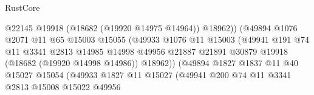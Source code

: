 \begin{lexlean}{RustCore}
\begin{coremodule}
                                            @22145
                                            @19918
                                            (@18682 (@19920 @14975 @14964))
                                            @18962))
                                        (@49894
                                          @1076
                                          @2071
                                          @11
                                          @65
                                          @15003
                                          @15055
                                          (@49933
                                            @1076
                                            @11
                                            @15003
                                            (@49941
                                              @191
                                              @74
                                              @11
                                              @3341
                                              @2813
                                              @14985
                                              @14998
                                              @49956
                                              @21887
                                              @21891
                                              @30879
                                              @19918
                                              (@18682 (@19920 @14998 @14986))
                                              @18962))
                                          (@49894
                                            @1827
                                            @1837
                                            @11
                                            @40
                                            @15027
                                            @15054
                                            (@49933
                                              @1827
                                              @11
                                              @15027
                                              (@49941
                                                @200
                                                @74
                                                @11
                                                @3341
                                                @2813
                                                @15008
                                                @15022
                                                @49956

\end{coremodule}
\end{lexlean}
